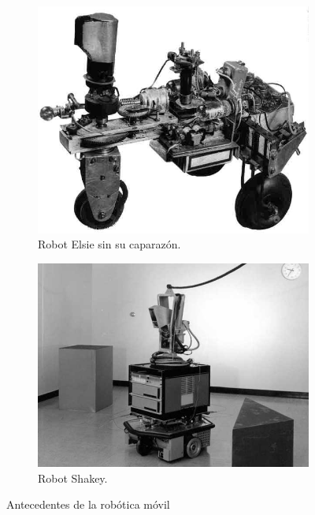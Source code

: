 \begin{figure}[htbp!]
	\centering
	\begin{subfigure}[h]{0.4\textwidth}
		\centering
		\includegraphics[width=\textwidth]{./Figuras/ELSIE}
		\caption{Robot Elsie sin su caparazón.}
		\label{fig:ELSIE}
	\end{subfigure}
	\begin{subfigure}[h]{0.4\textwidth}
		\centering
		\includegraphics[width=\textwidth]{./Figuras/Shakey}
		\caption{Robot Shakey.}
		\label{fig:Shakey}
	\end{subfigure}
	\caption{Antecedentes de la robótica móvil}
\end{figure}
